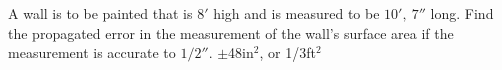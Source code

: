 {A wall is to be painted that is $8'$ high and is measured to be $10',\ 7''$ long. Find the propagated error in the measurement of the wall's surface area if the measurement is accurate to $1/2''$. 
}
{$\pm$48in$^2$, or 1/3ft$^2$
}

